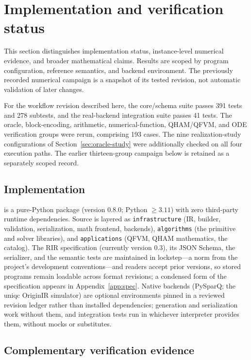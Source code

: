 \section{Implementation and verification status}
\label{sec:implementation}

This section distinguishes implementation status, instance-level
numerical evidence, and broader mathematical claims. Results are scoped
by program configuration, reference semantics, and backend environment.
The previously recorded numerical campaign is a snapshot of its tested
revision, not automatic validation of later changes.

For the workflow revision described here, the core/schema suite passes
391 tests and 278 subtests, and the real-backend integration suite passes
41 tests. The oracle, block-encoding, arithmetic, numerical-function,
QHAM/QFVM, and ODE verification groups were rerun, comprising 193 cases.
The nine realization-study configurations of
Section~\ref{sec:oracle-study} were additionally checked on all four
execution paths. The earlier thirteen-group campaign below is retained
as a separately scoped record.

\subsection{Implementation}
\label{sec:implementation-status}

\pqlang{} is a pure-Python package (version 0.8.0; Python $\ge 3.11$) with
zero third-party runtime dependencies.  Source is layered as
\texttt{infrastructure} (IR, builder, validation, serialization, math
frontend, backends), \texttt{algorithms} (the primitive and solver
libraries), and \texttt{applications} (QFVM, QHAM mathematics, the catalog).
The RIR specification (currently version 0.3), its JSON Schema, the
serializer, and the semantic tests are maintained in lockstep---a norm from
the project's development conventions---and readers accept prior versions,
so stored programs remain loadable across format revisions; a condensed
form of the specification appears in Appendix~\ref{app:spec}.  Native backends
(PySparQ; the uniqc OriginIR simulator) are optional environments pinned in
a reviewed revision ledger rather than installed dependencies; generation
and serialization work without them, and integration tests run in whichever
interpreter provides them, without mocks or substitutes.

\subsection{Complementary verification evidence}
\label{sec:evidence-ladder}

